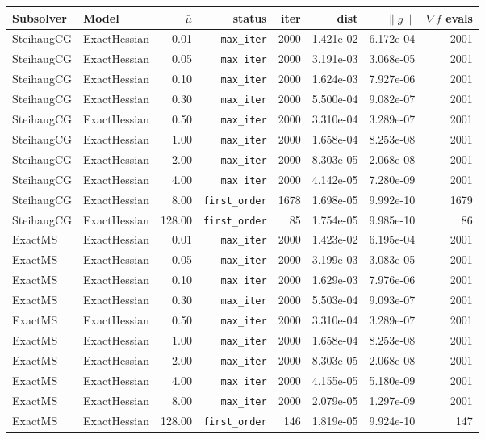 \begin{tabular}{@{}llrrrrrr@{}}
\toprule
Subsolver & Model & $\bar{\mu}$ & status & iter & dist & $\|g\|$ & $\nabla f$ evals \\ 
\midrule
SteihaugCG & ExactHessian & 0.01 & \texttt{max\_iter} & 2000 & 1.421e-02 & 6.172e-04 & 2001 \\ 
SteihaugCG & ExactHessian & 0.05 & \texttt{max\_iter} & 2000 & 3.191e-03 & 3.068e-05 & 2001 \\ 
SteihaugCG & ExactHessian & 0.10 & \texttt{max\_iter} & 2000 & 1.624e-03 & 7.927e-06 & 2001 \\ 
SteihaugCG & ExactHessian & 0.30 & \texttt{max\_iter} & 2000 & 5.500e-04 & 9.082e-07 & 2001 \\ 
SteihaugCG & ExactHessian & 0.50 & \texttt{max\_iter} & 2000 & 3.310e-04 & 3.289e-07 & 2001 \\ 
SteihaugCG & ExactHessian & 1.00 & \texttt{max\_iter} & 2000 & 1.658e-04 & 8.253e-08 & 2001 \\ 
SteihaugCG & ExactHessian & 2.00 & \texttt{max\_iter} & 2000 & 8.303e-05 & 2.068e-08 & 2001 \\ 
SteihaugCG & ExactHessian & 4.00 & \texttt{max\_iter} & 2000 & 4.142e-05 & 7.280e-09 & 2001 \\ 
SteihaugCG & ExactHessian & 8.00 & \texttt{first\_order} & 1678 & 1.698e-05 & 9.992e-10 & 1679 \\ 
SteihaugCG & ExactHessian & 128.00 & \texttt{first\_order} & 85 & 1.754e-05 & 9.985e-10 & 86 \\ 
ExactMS & ExactHessian & 0.01 & \texttt{max\_iter} & 2000 & 1.423e-02 & 6.195e-04 & 2001 \\ 
ExactMS & ExactHessian & 0.05 & \texttt{max\_iter} & 2000 & 3.199e-03 & 3.083e-05 & 2001 \\ 
ExactMS & ExactHessian & 0.10 & \texttt{max\_iter} & 2000 & 1.629e-03 & 7.976e-06 & 2001 \\ 
ExactMS & ExactHessian & 0.30 & \texttt{max\_iter} & 2000 & 5.503e-04 & 9.093e-07 & 2001 \\ 
ExactMS & ExactHessian & 0.50 & \texttt{max\_iter} & 2000 & 3.310e-04 & 3.289e-07 & 2001 \\ 
ExactMS & ExactHessian & 1.00 & \texttt{max\_iter} & 2000 & 1.658e-04 & 8.253e-08 & 2001 \\ 
ExactMS & ExactHessian & 2.00 & \texttt{max\_iter} & 2000 & 8.303e-05 & 2.068e-08 & 2001 \\ 
ExactMS & ExactHessian & 4.00 & \texttt{max\_iter} & 2000 & 4.155e-05 & 5.180e-09 & 2001 \\ 
ExactMS & ExactHessian & 8.00 & \texttt{max\_iter} & 2000 & 2.079e-05 & 1.297e-09 & 2001 \\ 
ExactMS & ExactHessian & 128.00 & \texttt{first\_order} & 146 & 1.819e-05 & 9.924e-10 & 147 \\ 
\bottomrule
\end{tabular}
